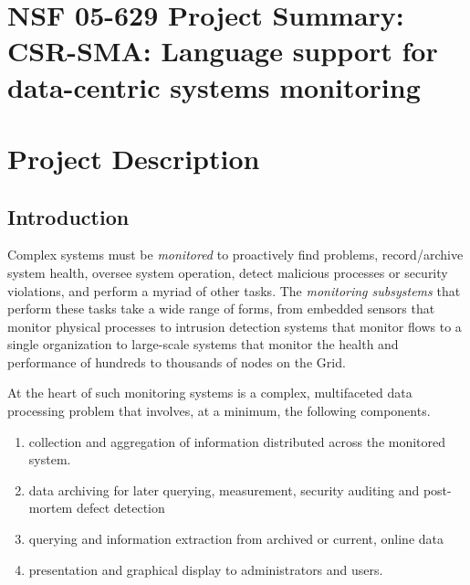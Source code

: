\documentclass[10pt]{article}
\begin{document}
\setcounter{page}{1}
\appendix
\section{NSF 05-629 Project Summary:  \\
CSR-SMA: Language support for data-centric systems monitoring
}

\newpage
\setcounter{page}{1}

\section{Project Description}


\subsection{Introduction}
\label{ssec:intro}

Complex systems must be {\em monitored} to proactively find problems,
record/archive system health, oversee system operation, detect
malicious processes or security violations, and perform a myriad of other tasks.
The {\em monitoring subsystems} 
that perform these tasks take a wide range of forms, 
from embedded sensors that monitor physical processes to
intrusion detection systems that monitor flows to a single
organization  
to large-scale systems
that monitor the health and performance of hundreds to thousands of nodes
on the Grid.

At the heart of such monitoring systems is a complex, multifaceted
data processing problem that involves, at a minimum, the following components.
\begin{enumerate}
\item collection and aggregation of information 
distributed across the monitored system.
\item data archiving for later querying, measurement, security auditing and 
post-mortem defect detection
\item querying and information extraction from archived or current, online data
\item presentation and graphical display to administrators and users.
\end{enumerate}
\end{document}
